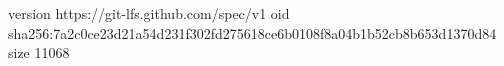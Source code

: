 version https://git-lfs.github.com/spec/v1
oid sha256:7a2c0ce23d21a54d231f302fd275618ce6b0108f8a04b1b52cb8b653d1370d84
size 11068
